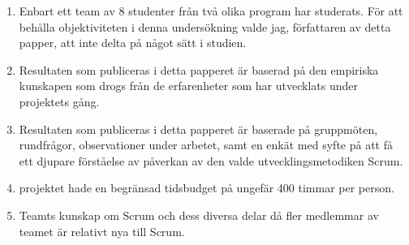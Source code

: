 \begin{enumerate}
\item [\textbullet ] Enbart ett team av 8 studenter från två olika program har studerats. För att behålla objektiviteten i denna undersökning valde jag, författaren av detta papper, att inte delta på något sätt i studien.

\item[\textbullet]  Resultaten som publiceras i detta papperet är baserad på den empiriska kunskapen som drogs från de erfarenheter som har utvecklats under projektets gång.

\item[\textbullet]  Resultaten som publiceras i detta papperet är baserade på gruppmöten, rundfrågor, observationer under arbetet, samt en enkät med syfte på att få ett djupare förståelse av påverkan av den valde utvecklingsmetodiken Scrum. 

\item [\textbullet]  projektet hade en begränsad tidsbudget på ungefär 400 timmar per person. 

\item[\textbullet] Teamts kunskap om Scrum och dess diversa delar då fler medlemmar av teamet är relativt nya till Scrum.
\end{enumerate}

 